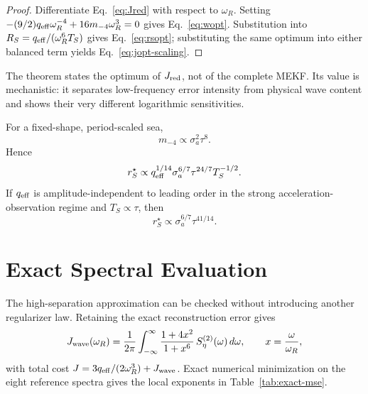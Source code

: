 \documentclass[conference]{IEEEtran}
\theoremstyle{remark}
\begin{document}
\begin{proof}
Differentiate Eq.~\eqref{eq:Jred} with respect to $\omega_R$.  Setting
$-(9/2)q_{\rm eff}\omega_R^{-4}+16m_{-4}\omega_R^3=0$ gives
Eq.~\eqref{eq:wopt}.  Substitution into
$R_S=q_{\rm eff}/(\omega_R^6T_S)$ gives Eq.~\eqref{eq:rsopt}; substituting the
same optimum into either balanced term yields Eq.~\eqref{eq:jopt-scaling}.
\end{proof}

The theorem states the optimum of $J_{\rm red}$, not of the complete MEKF.  Its
value is mechanistic: it separates low-frequency error intensity from physical
wave content and shows their very different logarithmic sensitivities.

For a fixed-shape, period-scaled sea,
\begin{equation}
 m_{-4}\propto\sigma_a^2\tau^8.
 \label{eq:m4-similarity}
\end{equation}
Hence
\begin{equation}
 r_S^\star\propto q_{\rm eff}^{1/14}
 \sigma_a^{6/7}\tau^{24/7}T_S^{-1/2}.
 \label{eq:rs-self-similar}
\end{equation}
If $q_{\rm eff}$ is amplitude-independent to leading order in the strong
acceleration-observation regime and $T_S\propto\tau$, then
\begin{equation}
 \boxed{r_S^\star\propto\sigma_a^{6/7}\tau^{41/14}.}
 \label{eq:rs-unclipped}
\end{equation}

\section{Exact Spectral Evaluation}
\label{sec:exact}

The high-separation approximation can be checked without introducing another
regularizer law.  Retaining the exact reconstruction error gives
\begin{equation}
J_{\rm wave}(\omega_R)
=\frac{1}{2\pi}\int_{-\infty}^{\infty}
\frac{1+4x^2}{1+x^6}\,S_\eta^{(2)}(\omega)\,d\omega,
\qquad x=\frac{\omega}{\omega_R},
\label{eq:exact-wave-cost}
\end{equation}
with total cost $J=3q_{\rm eff}/(2\omega_R^3)+J_{\rm wave}$.  Exact numerical
minimization on the eight reference spectra gives the local exponents in
Table~\ref{tab:exact-mse}.
\end{document}
